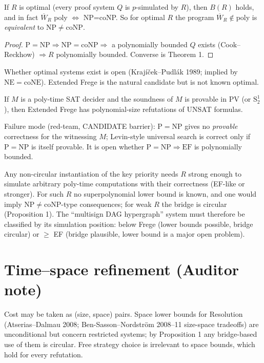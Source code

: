 \documentclass{article}
\begin{document}
\begin{proposition}
If $R$ is optimal (every proof system $Q$ is $p$-simulated by $R$), then $B(R)$ holds, and in fact $\overline W_R$ poly $\iff$ NP=coNP. So for optimal $R$ the program $\overline W_R\notin$poly is \emph{equivalent} to $\mathrm{NP}\ne\mathrm{coNP}$.\end{proposition}
\begin{proof}$\mathrm P=\mathrm{NP}\Rightarrow\mathrm{NP}=\mathrm{coNP}\Rightarrow$ a polynomially bounded $Q$ exists (Cook--Reckhow) $\Rightarrow R$ polynomially bounded. Converse is Theorem 1.\end{proof}
Whether optimal systems exist is open (Krajíček--Pudlák 1989; implied by $\mathrm{NE}=\mathrm{coNE}$). Extended Frege is the natural candidate but is not known optimal.

\begin{proposition}
If $M$ is a poly-time SAT decider and the soundness of $M$ is provable in $\mathrm{PV}$ (or $\mathrm{S}^1_2$), then Extended Frege has polynomial-size refutations of UNSAT formulas.\end{proposition}
Failure mode (red-team, CANDIDATE barrier): $\mathrm P=\mathrm{NP}$ gives no \emph{provable} correctness for the witnessing $M$; Levin-style universal search is correct only if $\mathrm P=\mathrm{NP}$ is itself provable. It is open whether $\mathrm P=\mathrm{NP}\Rightarrow\mathrm{EF}$ is polynomially bounded.

\begin{corollary}
Any non-circular instantiation of the key priority needs $R$ strong enough to simulate arbitrary poly-time computations with their correctness (EF-like or stronger). For such $R$ no superpolynomial lower bound is known, and one would imply $\mathrm{NP}\ne\mathrm{coNP}$-type consequences; for weak $R$ the bridge is circular (Proposition 1). The ``multisign DAG hypergraph'' system must therefore be classified by its simulation position: below Frege (lower bounds possible, bridge circular) or $\ge$ EF (bridge plausible, lower bound is a major open problem).
\end{corollary}

\section{Time--space refinement (Auditor note)}
Cost may be taken as (size, space) pairs. Space lower bounds for Resolution (Atserias--Dalmau 2008; Ben-Sasson--Nordstr\"om 2008--11 size-space tradeoffs) are unconditional but concern restricted systems; by Proposition 1 any bridge-based use of them is circular. Free strategy choice is irrelevant to space bounds, which hold for every refutation.
\end{document}
